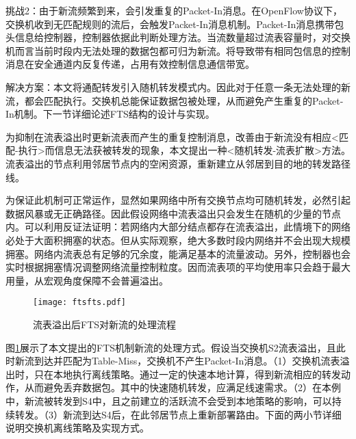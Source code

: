 挑战2：由于新流频繁到来，会引发重复的Packet-In消息。在OpenFlow协议下，交换机收到无匹配规则的流后，会触发Packet-In消息机制。Packet-In消息携带包头信息给控制器，控制器依据此判断处理方法。当流数量超过流表容量时，对交换机而言当前时段内无法处理的数据包都可归为新流。将导致带有相同包信息的控制消息在安全通道内反复传递，占用有效控制信息通信带宽。

解决方案：本文将通配转发引入随机转发模式内。因此对于任意一条无法处理的新流，都会匹配执行。交换机总能保证数据包被处理，从而避免产生重复的Packet-In机制。下一节详细论述FTS结构的设计与实现。



\label{chap55}

为抑制在流表溢出时更新流表而产生的重复控制消息，改善由于新流没有相应<匹配-执行>而信息无法获被转发的现象，本文提出一种<随机转发-流表扩散>方法。流表溢出的节点利用邻居节点内的空闲资源，重新建立从邻居到目的地的转发路径线。

为保证此机制可正常运作，显然如果网络中所有交换节点均可随机转发，必然引起数据风暴或无正确路径。因此假设网络中流表溢出只会发生在随机的少量的节点内。可以利用反证法证明：若网络内大部分结点都存在流表溢出，此情境下的网络必处于大面积拥塞的状态。但从实际观察，绝大多数时段内网络并不会出现大规模拥塞。网络内流表总有足够的冗余度，能满足基本的流量波动。另外，控制器也会实时根据拥塞情况调整网络流量控制粒度。因而流表项的平均使用率只会趋于最大用量，从宏观角度保障不会普遍溢出。



\begin{figure}[!ht]
	\centering 
	\vspace{-1.5mm} 
	\texttt{[image: ftsfts.pdf]}
	\caption{流表溢出后FTS对新流的处理流程} \label{fig:ftsfts}
\end{figure}

图\ref{fig:ftsfts}展示了本文提出的FTS机制新流的处理方式。假设当交换机S2流表溢出，且此时新流到达并匹配为Table-Miss，交换机不产生Packet-In消息。（1）交换机流表溢出时，只在本地执行离线策略。通过一定的快速本地计算，得到新流相应的转发动作，从而避免丢弃数据包。其中的快速随机转发，应满足线速需求。（2）在本例中，新流被转发到S4中，且之前建立的活跃流不会受到本地策略的影响，可以持续转发。（3）新流到达S4后，在此邻居节点上重新部署路由。下面的两小节详细说明交换机离线策略及实现方式。




